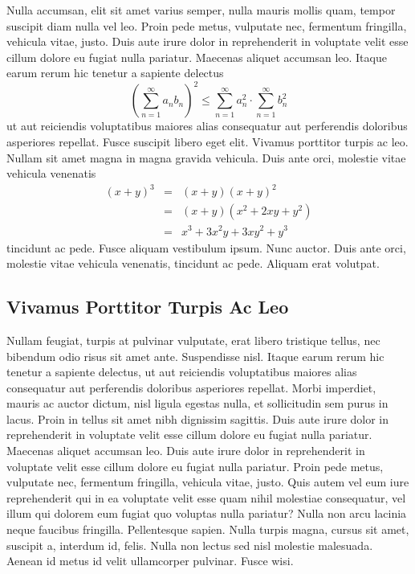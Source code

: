 Nulla accumsan, elit sit amet varius semper, nulla mauris mollis quam, tempor suscipit diam nulla vel leo. Proin pede metus, vulputate nec, fermentum fringilla, vehicula vitae, justo. Duis aute irure dolor in reprehenderit in voluptate velit esse cillum dolore eu fugiat nulla pariatur. Maecenas aliquet accumsan leo. Itaque earum rerum hic tenetur a sapiente delectus
\begin{equation}
\left(\sum_{n=1}^{\infty}a_{n}b_{n}\right)^{2} \leq
\sum_{n=1}^{\infty}a_{n}^{2} \cdot \sum_{n=1}^{\infty}b_{n}^{2}
\label{eq:A}
\end{equation}
ut aut reiciendis voluptatibus maiores alias consequatur aut perferendis doloribus asperiores repellat. Fusce suscipit libero eget elit. Vivamus porttitor turpis ac leo. Nullam sit amet magna in magna gravida vehicula. Duis ante orci, molestie vitae vehicula venenatis
\begin{eqnarray}
(x+y)^{3} & = & (x+y)(x+y)^{2}\label{eq:B}\\
          & = & (x+y)(x^{2}+2xy+y^{2})\nonumber\\
          & = & x^{3}+3x^{2}y+3xy^{2}+y^{3}\label{eq:C}
\end{eqnarray}
tincidunt ac pede. Fusce aliquam vestibulum ipsum. Nunc auctor. Duis ante orci, molestie vitae vehicula venenatis, tincidunt ac pede. Aliquam erat volutpat.

\subsection{Vivamus Porttitor Turpis Ac Leo}
Nullam feugiat, turpis at pulvinar vulputate, erat libero tristique tellus, nec bibendum odio risus sit amet ante. Suspendisse nisl. Itaque earum rerum hic tenetur a sapiente delectus, ut aut reiciendis voluptatibus maiores alias consequatur aut perferendis doloribus asperiores repellat. Morbi imperdiet, mauris ac auctor dictum, nisl ligula egestas nulla, et sollicitudin sem purus in lacus. Proin in tellus sit amet nibh dignissim sagittis. Duis aute irure dolor in reprehenderit in voluptate velit esse cillum dolore eu fugiat nulla pariatur. Maecenas aliquet accumsan leo. Duis aute irure dolor in reprehenderit in voluptate velit esse cillum dolore eu fugiat nulla pariatur. Proin pede metus, vulputate nec, fermentum fringilla, vehicula vitae, justo. Quis autem vel eum iure reprehenderit qui in ea voluptate velit esse quam nihil molestiae consequatur, vel illum qui dolorem eum fugiat quo voluptas nulla pariatur? Nulla non arcu lacinia neque faucibus fringilla. Pellentesque sapien. Nulla turpis magna, cursus sit amet, suscipit a, interdum id, felis. Nulla non lectus sed nisl molestie malesuada. Aenean id metus id velit ullamcorper pulvinar. Fusce wisi.

